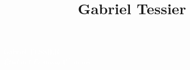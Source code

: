 \documentclass[11pt,oneside,a4paper,titlepage]{article}
\title{Gabriel Tessier}
\date{}
\begin{document}
\begin{tcolorbox}
  \begin{minipage}{4.5cm}
  \end{minipage}
  \begin{minipage}{15cm}
    \begin{center}
      \Huge{\textcolor{white}{Gabriel TESSIER}}\\
      \vspace*{0.5cm}
      \Large{\textcolor{white}{\emph{Étudiant Ensimag $1^{er}$ année}}}
    \end{center}
  \end{minipage}
\end{tcolorbox}
\end{document}
